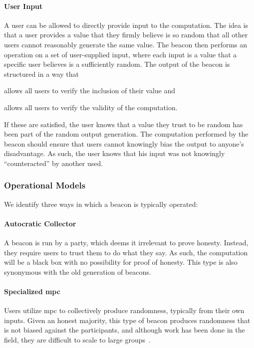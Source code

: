 \paragraph{User Input}
A user can be allowed to directly provide input to the computation.
The idea is that a user provides a value that they firmly believe is so random that all other users cannot reasonably generate the same value.
The beacon then performs an operation on a set of user-supplied input, where each input is a value that a specific user believes is a sufficiently random. The output of the beacon is structured in a way that
\begin{eletterate*}
    \item allows all users to verify the inclusion of their value and
    \item allows all users to verify the validity of the computation.
\end{eletterate*}

If these are satisfied, the user knows that a value they trust to be random has been part of the random output generation. The computation performed by the beacon should ensure that users cannot knowingly bias the output to anyone's disadvantage. As such, the user knows that his input was not knowingly \enquote{counteracted} by another used.

\subsubsection{Operational Models}
We identify three ways in which a beacon is typically operated:

\paragraph{Autocratic Collector} A beacon is run by a party, which deems it irrelevant to prove honesty. Instead, they require users to trust them to do what they say. As such, the computation will be a black box with no possibility for proof of honesty. This type is also synonymous with the old generation of beacons.

\paragraph{Specialized \acrshort{mpc}} Users utilize \acrfull{mpc} to collectively produce randomness, typically from their own inputs. Given an honest majority, this type of beacon produces randomness that is not biased against the participants, and although work has been done in the field, they are difficult to scale to large groups~\cite{cascudo2017scrape, syta2017scalable}.

